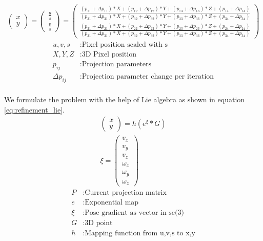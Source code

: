 \documentclass[11pt,a4paper,titlepage,oneside]{report}
\begin{document}
\begin{equation}\label{eq:refinement_projection}
  \begin{gathered}
    \begin{pmatrix}
      x \\
      y 
    \end{pmatrix}=
    \begin{pmatrix}
      \frac{u}{s} \\
      \frac{v}{s} 
    \end{pmatrix}=
    \begin{pmatrix}
      \frac{(p_{11} + \Delta p_{11})*X + (p_{12} + \Delta p_{12})*Y + (p_{13} + \Delta p_{13})*Z + (p_{14} + \Delta p_{14})}{(p_{31}+\Delta p_{31})*X + (p_{32} + \Delta p_{32})*Y + (p_{33} + \Delta p_{33})*Z + (p_{34} + \Delta p_{34})}  \\
      \frac{(p_{21} + \Delta p_{21})*X + (p_{22} + \Delta p_{22})*Y + (p_{23} + \Delta p_{23})*Z + (p_{24} + \Delta p_{24})}{(p_{31}+\Delta p_{31})*X + (p_{32} + \Delta p_{32})*Y + (p_{33} + \Delta p_{33})*Z + (p_{34} + \Delta p_{34})}
    \end{pmatrix}
  \end{gathered}
\end{equation}
\begin{align*}
  u,v,s           &:  \text{Pixel position scaled with s}\\
  X,Y,Z           &:  \text{3D Pixel position}\\
  p_{ij}          &:  \text{Projection parameters}\\
  \Delta p_{ij}   &:  \text{Projection parameter change per iteration}\\
\end{align*}

We formulate the problem with the help of Lie algebra as shown in equation \ref{eq:refinement_lie}.
\begin{equation}\label{eq:refinement_lie}
  \begin{gathered}
    \begin{pmatrix}
      x\\
      y
    \end{pmatrix}
    =h(e^{\xi}*G)\\
    \xi=\begin{pmatrix}
      v_x\\
      v_y\\
      v_z\\
      \omega_x\\
      \omega_y\\
      \omega_z
    \end{pmatrix}
  \end{gathered}
\end{equation}
\begin{align*}
  P     &: \text{Current projection matrix}\\
  e     &: \text{Exponential map}\\
  \xi   &: \text{Pose gradient as vector in se(3)}\\
  G     &: \text{3D point}\\
  h     &: \text{Mapping function from u,v,s to x,y}
\end{align*}
\end{document}
